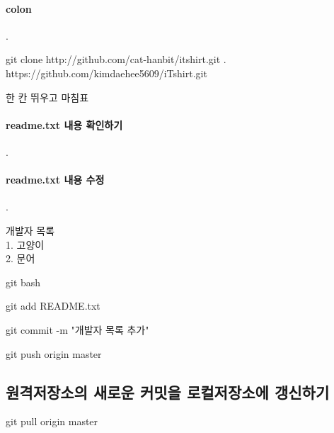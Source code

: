 \documentclass[12pt, a4paper, oneside]{book}
\begin{document}
			\paragraph{colon}
			.\\
			\begin{tcolorbox}
				git clone	 	http://github.com/cat-hanbit/itshirt.git .\\
							https://github.com/kimdaehee5609/iTshirt.git
			\end{tcolorbox}
			한 칸 뛰우고 마침표


			\paragraph{readme.txt 내용 확인하기} 
			.\\

			\paragraph{readme.txt 내용 수정} 
			.\\

			\begin{tcolorbox}
				개발자 목록\\
				1. 고양이 \\
				2. 문어
			\end{tcolorbox}

			\begin{tcolorbox}
				git bash
			\end{tcolorbox}

			\begin{tcolorbox}
				git add README.txt
			\end{tcolorbox}

			\begin{tcolorbox}
				git commit -m "개발자 목록 추가"
			\end{tcolorbox}

			\begin{tcolorbox}
				git push origin master
			\end{tcolorbox}

		
		\subsection 	{원격저장소의 새로운 커밋을 로컬저장소에 갱신하기}

			\begin{tcolorbox}
				git pull origin master
			\end{tcolorbox}
\end{document}
